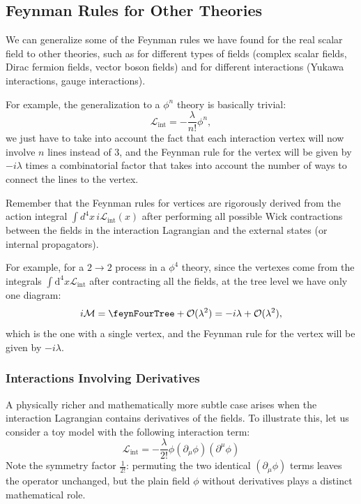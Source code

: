 \subsection{Feynman Rules for Other Theories}

We can generalize some of the Feynman rules we have found for the real scalar field to other theories, such as for different types of fields (complex scalar fields, Dirac fermion fields, vector boson fields) and for different interactions (Yukawa interactions, gauge interactions).

For example, the generalization to a \(\phi^n\) theory is basically trivial:
\[
    \mathcal{L}_\text{int} = - \frac{\lambda}{n!} \phi^n,
\]
we just have to take into account the fact that each interaction vertex will now involve \(n\) lines instead of 3, and the Feynman rule for the vertex will be given by \(-i \lambda\) times a combinatorial factor that takes into account the number of ways to connect the lines to the vertex.

\begin{remark}
    Remember that the Feynman rules for vertices are rigorously derived from the action integral $\int d^4x \, i\mathcal{L}_{\text{int}}(x)$ after performing all possible Wick contractions between the fields in the interaction Lagrangian and the external states (or internal propagators).
\end{remark}

For example, for a \(2 \to 2\) process in a \(\phi^4\) theory, since the vertexes come from the integrals \(\int \mathrm{d}^4 x \mathcal{L}_{\text{int}}\) after contracting all the fields, at the tree level we have only one diagram:
\[
    i \mathcal{M} = \feynFourTree + \mathcal{O}(\lambda^2) = -i \lambda + \mathcal{O}(\lambda^2),
\]
which is the one with a single vertex, and the Feynman rule for the vertex will be given by \(-i \lambda\).

\subsubsection{Interactions Involving Derivatives}

A physically richer and mathematically more subtle case arises when the interaction Lagrangian contains derivatives of the fields. To illustrate this, let us consider a toy model with the following interaction term:
\[
    \mathcal{L}_{\text{int}} = -\frac{\lambda}{2!} \phi (\partial_\mu \phi)(\partial^\mu \phi)
\]
Note the symmetry factor $\frac{1}{2!}$: permuting the two identical $(\partial_\mu \phi)$ terms leaves the operator unchanged, but the plain field $\phi$ without derivatives plays a distinct mathematical role.


